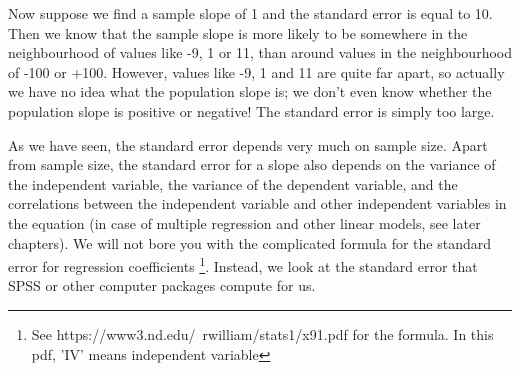 \documentclass[]{book}\usepackage[]{graphicx}\usepackage[]{color}
\begin{document}
Now suppose we find a sample slope of 1 and the standard error is equal to 10. Then we know that the sample slope is more likely to be somewhere in the neighbourhood of values like -9, 1 or 11, than around values in the neighbourhood of -100 or +100. However, values like -9, 1 and 11 are quite far apart, so actually we have no idea what the population slope is; we don't even know whether the population slope is positive or negative! The standard error is simply too large.

As we have seen, the standard error depends very much on sample size. Apart from sample size, the standard error for a slope also depends on the variance of the independent variable, the variance of the dependent variable, and the correlations between the independent variable and other independent variables in the equation (in case of multiple regression and other linear models, see later chapters). We will not bore you with the complicated formula for the standard error for regression coefficients \footnote{See https://www3.nd.edu/~rwilliam/stats1/x91.pdf for the formula. In this pdf, 'IV' means independent variable}. Instead, we look at the standard error that SPSS or other computer packages compute for us.



\end{document}
